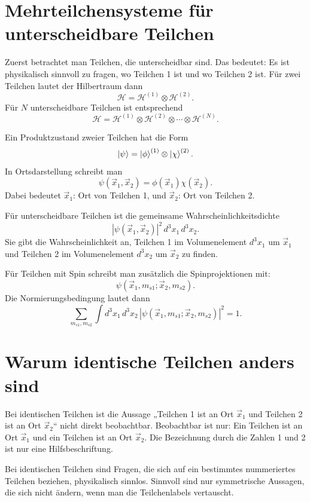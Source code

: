 \section{Mehrteilchensysteme für unterscheidbare Teilchen}

Zuerst betrachtet man Teilchen, die unterscheidbar sind. Das bedeutet: Es ist physikalisch sinnvoll zu fragen, wo Teilchen 1 ist und wo Teilchen 2 ist. Für zwei Teilchen lautet der Hilbertraum dann
\[
    \mathcal H = \mathcal H^{(1)}\otimes \mathcal H^{(2)}.
\]
Für \(N\) unterscheidbare Teilchen ist entsprechend
\[
    \mathcal H = \mathcal H^{(1)}\otimes\mathcal H^{(2)}\otimes\cdots\otimes\mathcal H^{(N)}.
\]

Ein Produktzustand zweier Teilchen hat die Form
\[
    \left|\psi\right\rangle=\left|\phi\right\rangle^{(1)}\otimes\left|\chi\right\rangle^{(2)}.
\]
In Ortsdarstellung schreibt man
\[
    \psi(\vec x_1,\vec x_2)
    = \phi(\vec x_1)\chi(\vec x_2).
\]
Dabei bedeutet \(\vec x_1\): Ort von Teilchen 1, und \(\vec x_2\): Ort von Teilchen 2.

\begin{definitionbox}
Für unterscheidbare Teilchen ist die gemeinsame Wahrscheinlichkeitsdichte
\[
    |\psi(\vec x_1,\vec x_2)|^2\,d^3x_1\,d^3x_2.
\]
Sie gibt die Wahrscheinlichkeit an, Teilchen 1 im Volumenelement \(d^3x_1\) um \(\vec x_1\) und Teilchen 2 im Volumenelement \(d^3x_2\) um \(\vec x_2\) zu finden.
\end{definitionbox}

Für Teilchen mit Spin schreibt man zusätzlich die Spinprojektionen mit:
\[
    \psi(\vec x_1,m_{s1};\vec x_2,m_{s2}).
\]
Die Normierungsbedingung lautet dann
\[
    \sum_{m_{s1},m_{s2}}\int d^3x_1\,d^3x_2\,
    |\psi(\vec x_1,m_{s1};\vec x_2,m_{s2})|^2=1.
\]

\section{Warum identische Teilchen anders sind}

Bei identischen Teilchen ist die Aussage „Teilchen 1 ist an Ort \(\vec x_1\) und Teilchen 2 ist an Ort \(\vec x_2\)“ nicht direkt beobachtbar. Beobachtbar ist nur: Ein Teilchen ist an Ort \(\vec x_1\) und ein Teilchen ist an Ort \(\vec x_2\). Die Bezeichnung durch die Zahlen 1 und 2 ist nur eine Hilfsbeschriftung.

\begin{notebox}
Bei identischen Teilchen sind Fragen, die sich auf ein bestimmtes nummeriertes Teilchen beziehen, physikalisch sinnlos. Sinnvoll sind nur symmetrische Aussagen, die sich nicht ändern, wenn man die Teilchenlabels vertauscht.
\end{notebox}

